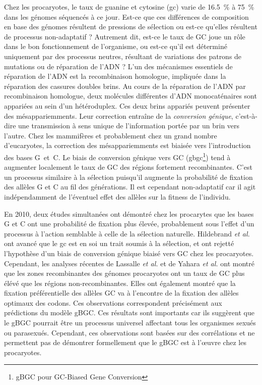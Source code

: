 Chez les procaryotes, le taux de guanine et cytosine (\ac{gc}) varie de
\SI{16.5}{\percent} à \SI{75}{\percent} dans les génomes séquencés à ce jour.
Est-ce que ces différences de composition en base des génomes résultent de
pressions de sélection ou est-ce qu'elles résultent de processus non-adaptatif ?
Autrement dit, est-ce le taux de GC joue un rôle dans le bon fonctionnement de
l'organisme, ou est-ce qu'il est déterminé uniquement par des processus neutres,
résultant de variations des patrons de mutations ou de réparation de l'ADN ?
L'un des mécanismes essentiels de réparation de l'ADN est la recombinaison
homologue, impliquée dans la réparation des cassures doubles brins. Au cours de
la réparation de l'ADN par recombinaison homologue, deux molécules différentes
d'ADN monocaténaires sont appariées au sein d'un hétéroduplex. Ces deux brins
appariés peuvent présenter des mésappariemments. Leur correction entraîne de la
\emph{conversion génique}\cite{chen_gene_2007}, c'est-à-dire une transmission à
sens unique de l'information portée par un brin vers l'autre. Chez les
mammifères et probablement chez un grand nombre d'eucaryotes, la correction des
mésappariemments est biaisée vers l'introduction des bases
G~et~C\cite{pessia_evidence_2012}. Le biais de conversion génique vers GC
(\ac{gbgc}\footnote{gBGC pour GC-Biased Gene Conversion}) tend à augmenter
localement le taux de GC des régions fortement
recombinantes\cite{duret_biased_2009,lesecque_gc-biased_2013,williams_non-crossover_2015}.
C'est un processus similaire à la sélection puisqu'il augmente la probabilité de
fixation des allèles G et C au fil des générations. Il est cependant
non-adaptatif car il agit indépendamment de l'éventuel effet des allèles sur la
fitness de l'individu.

En 2010, deux études simultanées\cite{hildebrand_evidence_2010,
  hershberg_evidence_2010} ont démontré chez les procarytes que les bases G et C
ont une probabilité de fixation plus élevée, probablement sous l'effet d'un
processus à l'action semblable à celle de la sélection naturelle. Hildebrand
\emph{et al.} ont avancé que le \ac{gc} est en soi un trait soumis à la
sélection, et ont rejetté l'hypothèse d'un biais de conversion génique biaisé
vers GC chez les procaryotes. Cependant, les analyses récentes de Lassalle
\emph{et al.} \cite{lassalle_gc-content_2015} et de Yahara \emph{et
  al.}\cite{yahara_landscape_2016} ont montré que les zones recombinantes des
génomes procaryotes ont un taux de GC plus élévé que les régions
non-recombinantes. Elles ont également montré que la fixation préférentielle des
allèles GC va à l'encontre de la fixation des allèles optimaux des codons. Ces
observations correspondent précisément aux prédictions du modèle gBGC. Ces
résultats sont importants car ils suggèrent que le gBGC pourrait être un
processus universel affectant tous les organismes sexués ou parasexués.
Cependant, ces observations sont basées sur des corrélations et ne permettent
pas de démontrer formellement que le gBGC est à l'œuvre chez les procaryotes.

